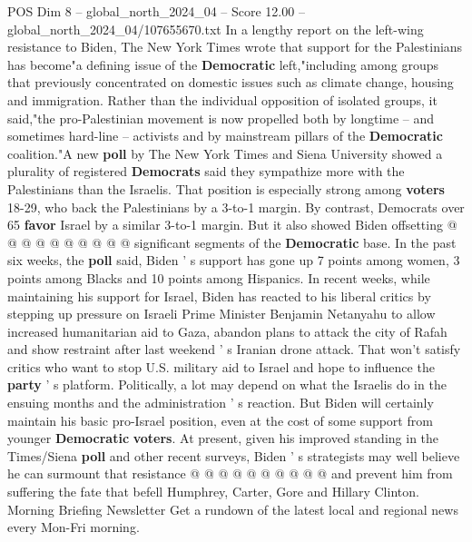 \begin{textsample}{POS Dim 8 – global\_north\_2024\_04 – Score 12.00 – global\_north\_2024\_04/107655670.txt}
In a lengthy report on the left-wing resistance to Biden, The New York Times wrote that support for the Palestinians has become"a defining issue of the \textbf{Democratic} left,"including among groups that previously concentrated on domestic issues such as climate change, housing and immigration.
Rather than the individual opposition of isolated groups, it said,"the pro-Palestinian movement is now propelled both by longtime -- and sometimes hard-line -- activists and by mainstream pillars of the \textbf{Democratic} coalition."A new \textbf{poll} by The New York Times and Siena University showed a plurality of registered \textbf{Democrats} said they sympathize more with the Palestinians than the Israelis.
That position is especially strong among \textbf{voters} 18-29, who back the Palestinians by a 3-to-1 margin.
By contrast, Democrats over 65 \textbf{favor} Israel by a similar 3-to-1 margin.
But it also showed Biden offsetting @ @ @ @ @ @ @ @ @ @ significant segments of the \textbf{Democratic} base.
In the past six weeks, the \textbf{poll} said, Biden ' s support has gone up 7 points among women, 3 points among Blacks and 10 points among Hispanics.
In recent weeks, while maintaining his support for Israel, Biden has reacted to his liberal critics by stepping up pressure on Israeli Prime Minister Benjamin Netanyahu to allow increased humanitarian aid to Gaza, abandon plans to attack the city of Rafah and show restraint after last weekend ' s Iranian drone attack.
That won't satisfy critics who want to stop U.S. military aid to Israel and hope to influence the \textbf{party} ' s platform.
Politically, a lot may depend on what the Israelis do in the ensuing months and the administration ' s reaction.
But Biden will certainly maintain his basic pro-Israel position, even at the cost of some support from younger \textbf{Democratic} \textbf{voters}.
At present, given his improved standing in the Times/Siena \textbf{poll} and other recent surveys, Biden ' s strategists may well believe he can surmount that resistance @ @ @ @ @ @ @ @ @ @ and prevent him from suffering the fate that befell Humphrey, Carter, Gore and Hillary Clinton.
Morning Briefing Newsletter Get a rundown of the latest local and regional news every Mon-Fri morning.

\end{textsample}
